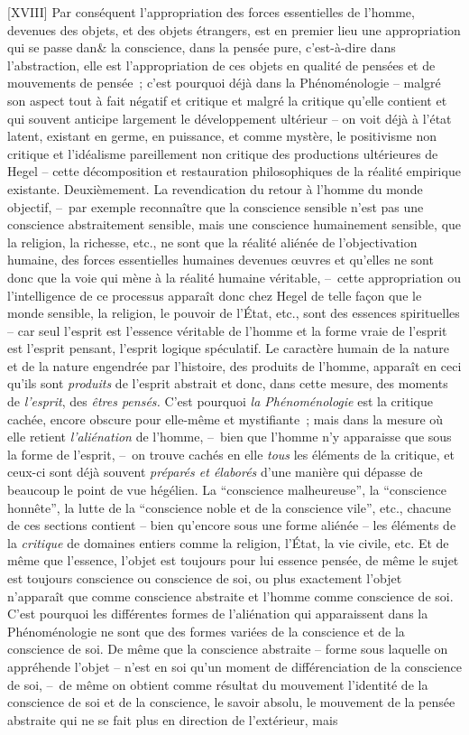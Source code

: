 \documentclass[french,twoside]{book} %
\begin{document}
[XVIII] Par conséquent l’appropriation des forces essentielles de l’homme, devenues des objets, et des objets étrangers, est en premier lieu une appropriation qui se passe dan\& la conscience, dans la pensée pure, c’est-à-dire dans l’abstraction, elle est l’appropriation de ces objets en qualité de pensées et de mouvements de pensée ; c’est pourquoi déjà dans la Phénoménologie – malgré son aspect tout à fait négatif et critique et malgré la critique qu’elle contient et qui souvent anticipe largement le développement ultérieur – on voit déjà à l’état latent, existant en germe, en puissance, et comme mystère, le positivisme non critique et l’idéalisme pareillement non critique des productions ultérieures de Hegel – cette décomposition et restauration philosophiques de la réalité empirique existante. Deuxièmement. La revendication du retour à l’homme du monde objectif, – par exemple reconnaître que la conscience sensible n’est pas une conscience abstraitement sensible, mais une conscience humainement sensible, que la religion, la richesse, etc., ne sont que la réalité aliénée de l’objectivation humaine, des forces essentielles humaines devenues œuvres et qu’elles ne sont donc que la voie qui mène à la réalité humaine véritable, – cette appropriation ou l’intelligence de ce processus apparaît donc chez Hegel de telle façon que le monde sensible, la religion, le pouvoir de l’État, etc., sont des essences spirituelles – car seul l’esprit est l’essence véritable de l’homme et la forme vraie de l’esprit est l’esprit pensant, l’esprit logique spéculatif. Le caractère humain de la nature et de la nature engendrée par l’histoire, des produits de l’homme, apparaît en ceci qu’ils sont \emph{produits} de l’esprit abstrait et donc, dans cette mesure, des moments de \emph{l’esprit}, des \emph{êtres pensés.} C’est pourquoi \emph{la Phénoménologie} est la critique cachée, encore obscure pour elle-même et mystifiante ; mais dans la mesure où elle retient \emph{l’aliénation} de l’homme, – bien que l’homme n’y apparaisse que sous la forme de l’esprit, – on trouve cachés en elle \emph{tous} les éléments de la critique, et ceux-ci sont déjà souvent \emph{préparés et élaborés} d’une manière qui dépasse de beaucoup le point de vue hégélien. La “conscience malheureuse”, la “conscience honnête”, la lutte de la “conscience noble et de la conscience vile”, etc., chacune de ces sections contient – bien qu’encore sous une forme aliénée – les éléments de la \emph{critique} de domaines entiers comme la religion, l’État, la vie civile, etc. Et de même que l’essence, l’objet est toujours pour lui essence pensée, de même le sujet est toujours conscience ou conscience de soi, ou plus exactement l’objet n’apparaît que comme conscience abstraite et l’homme comme conscience de soi. C’est pourquoi les différentes formes de l’aliénation qui apparaissent dans la Phénoménologie ne sont que des formes variées de la conscience et de la conscience de soi. De même que la conscience abstraite – forme sous laquelle on appréhende l’objet – n’est en soi qu’un moment de différenciation de la conscience de soi, – de même on obtient comme résultat du mouvement l’identité de la conscience de soi et de la conscience, le savoir absolu, le mouvement de la pensée abstraite qui ne se fait plus en direction de l’extérieur, mais 
\end{document}
